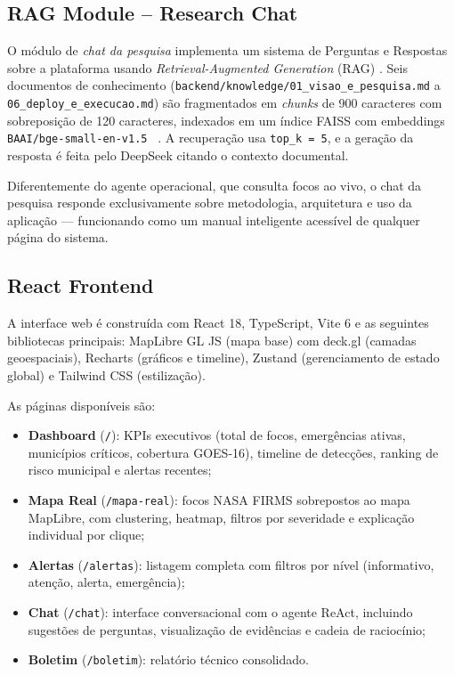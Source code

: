 \documentclass[preprint,times,numbers]{elsarticle}
\begin{document}
\subsection{RAG Module -- Research Chat}
\label{sec:rag}

O módulo de \emph{chat da pesquisa} implementa um sistema de Perguntas e Respostas sobre a plataforma usando \emph{Retrieval-Augmented Generation} (RAG) \cite{article:lewis2020,article:izacard2022,article:gao2024rag}. Seis documentos de conhecimento (\texttt{backend/knowledge/01\_visao\_e\_pesquisa.md} a \texttt{06\_deploy\_e\_execucao.md}) são fragmentados em \emph{chunks} de 900 caracteres com sobreposição de 120 caracteres, indexados em um índice FAISS \cite{article:faiss2017} com embeddings \texttt{BAAI/bge-small-en-v1.5} ~\cite{model:bge2024}. A recuperação usa \texttt{top\_k = 5}, e a geração da resposta é feita pelo DeepSeek citando o contexto documental.

Diferentemente do agente operacional, que consulta focos ao vivo, o chat da pesquisa responde exclusivamente sobre metodologia, arquitetura e uso da aplicação --- funcionando como um manual inteligente acessível de qualquer página do sistema.

\subsection{React Frontend}
\label{sec:frontend}

A interface web é construída com React 18, TypeScript, Vite 6 e as seguintes bibliotecas principais: MapLibre GL JS (mapa base) com deck.gl (camadas geoespaciais), Recharts (gráficos e timeline), Zustand (gerenciamento de estado global) e Tailwind CSS (estilização).

As páginas disponíveis são:

\begin{itemize}
    \item \textbf{Dashboard} (\texttt{/}): KPIs executivos (total de focos, emergências ativas, municípios críticos, cobertura GOES-16), timeline de detecções, ranking de risco municipal e alertas recentes;
    \item \textbf{Mapa Real} (\texttt{/mapa-real}): focos NASA FIRMS sobrepostos ao mapa MapLibre, com clustering, heatmap, filtros por severidade e explicação individual por clique;
    \item \textbf{Alertas} (\texttt{/alertas}): listagem completa com filtros por nível (informativo, atenção, alerta, emergência);
    \item \textbf{Chat} (\texttt{/chat}): interface conversacional com o agente ReAct, incluindo sugestões de perguntas, visualização de evidências e cadeia de raciocínio;
    \item \textbf{Boletim} (\texttt{/boletim}): relatório técnico consolidado.
\end{itemize}
\end{document}
